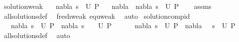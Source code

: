 \begin{isabellebody}
\isanewline
\isanewline
\isanewline
\isanewline
{}\isamarkupfalse%
\ solution{\isacharunderscore}{\kern0pt}weak{\isacharcolon}{\kern0pt}\isanewline
\ \ \ {\isachardoublequoteopen}{\isacharparenleft}{\kern0pt}nabla{}{\isacharcomma}{\kern0pt}\ s{\isacharparenright}{\kern0pt}\ {\isasymin}\ U\ P{\isachardoublequoteclose}\isanewline
\ \ \ {\isachardoublequoteopen}{\isacharparenleft}{\kern0pt}nabla{}\ {\isasymunion}\ nabla{}{\isacharcomma}{\kern0pt}\ s{\isacharparenright}{\kern0pt}\ {\isasymin}\ U\ P{\isachardoublequoteclose}\isanewline
%
\isadelimproof
\ \ %
\endisadelimproof
%
\isatagproof
{}\isamarkupfalse%
\ assms\isanewline
\ \ \isamarkupfalse%
\ all{\isacharunderscore}{\kern0pt}solutions{\isacharunderscore}{\kern0pt}def\ \isamarkupfalse%
\ fresh{\isacharunderscore}{\kern0pt}weak\ equ{\isacharunderscore}{\kern0pt}weak\ \isamarkupfalse%
\ auto%
\endisatagproof
{\isafoldproof}%
%
\isadelimproof
\isanewline
%
\endisadelimproof
\isanewline
{}\isamarkupfalse%
\ solution{\isacharunderscore}{\kern0pt}comp{\isacharunderscore}{\kern0pt}id{\isacharcolon}{\kern0pt}\ \isanewline
\ \ \ {\isachardoublequoteopen}{\isacharparenleft}{\kern0pt}{\isacharparenleft}{\kern0pt}nabla{\isacharcomma}{\kern0pt}\ s{\isacharparenright}{\kern0pt}\ {\isasymin}\ U\ P{\isacharparenright}{\kern0pt}\ {\isacharequal}{\kern0pt}\ {\isacharparenleft}{\kern0pt}{\isacharparenleft}{\kern0pt}nabla{\isacharcomma}{\kern0pt}\ s\ {\isasymbullet}\ {\isacharbrackleft}{\kern0pt}{\isacharbrackright}{\kern0pt}{\isacharparenright}{\kern0pt}\ {\isasymin}\ U\ P{\isacharparenright}{\kern0pt}{\isachardoublequoteclose}\ \ \isanewline
\ \ \ \ {\isachardoublequoteopen}{\isacharparenleft}{\kern0pt}{\isacharparenleft}{\kern0pt}nabla{\isacharcomma}{\kern0pt}\ s{\isacharparenright}{\kern0pt}\ {\isasymin}\ U\ P{\isacharparenright}{\kern0pt}\ {\isacharequal}{\kern0pt}\ {\isacharparenleft}{\kern0pt}{\isacharparenleft}{\kern0pt}nabla{\isacharcomma}{\kern0pt}\ {\isacharbrackleft}{\kern0pt}{\isacharbrackright}{\kern0pt}\ {\isasymbullet}\ s{\isacharparenright}{\kern0pt}\ {\isasymin}\ U\ P{\isacharparenright}{\kern0pt}{\isachardoublequoteclose}\isanewline
%
\isadelimproof
\ \ %
\endisadelimproof
%
\isatagproof
{}\isamarkupfalse%
\ all{\isacharunderscore}{\kern0pt}solutions{\isacharunderscore}{\kern0pt}def\ \isamarkupfalse%
\ auto%
\endisatagproof
{\isafoldproof}%
%
\isadelimproof
\isanewline

\end{isabellebody}
